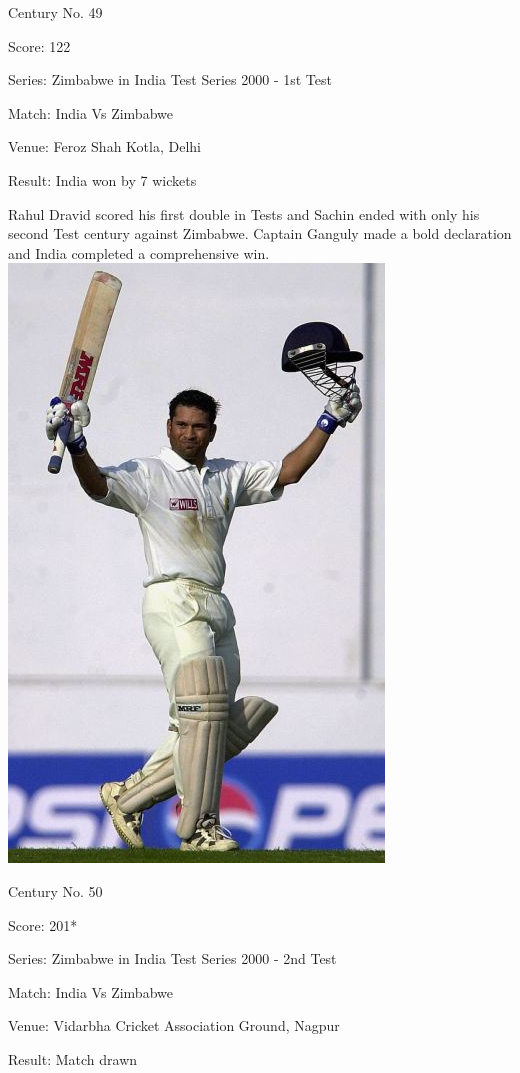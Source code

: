 \documentclass[11pt, a4paper]{article}
\begin{document}
Century No. 49 

Score: 122 

Series: Zimbabwe in India Test Series 2000 - 1st Test 

Match: India Vs Zimbabwe 

Venue: Feroz Shah Kotla, Delhi 

Result: India won by 7 wickets 

Rahul Dravid scored his first double in Tests and Sachin ended with only his second Test century against Zimbabwe. Captain Ganguly made a bold declaration and India completed a comprehensive win.
\newpage
\includegraphics[height=0.8\textheight]{pics/50.jpg}

Century No. 50 

Score: 201* 

Series: Zimbabwe in India Test Series 2000 - 2nd Test 

Match: India Vs Zimbabwe 

Venue: Vidarbha Cricket Association Ground, Nagpur 

Result: Match drawn 
\end{document}
